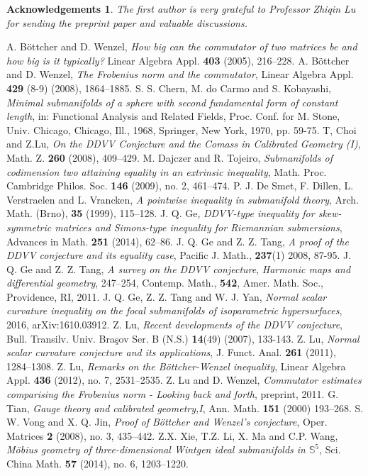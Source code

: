 \documentclass[a4paper,11pt]{amsart}
\numberwithin{equation}{section} \theoremstyle{plain}
\newtheorem{ack}{Acknowledgements}
\begin{document}
\begin{ack}
The first author is very grateful to Professor Zhiqin Lu for sending the preprint paper \cite{LW11} and valuable discussions. 
\end{ack}

\begin{thebibliography}{123}
A. B\"{o}ttcher and D. Wenzel, \emph{How big can the commutator of two matrices be and how big is it typically?} Linear Algebra Appl. \textbf{403} (2005), 216--228.
A. B\"{o}ttcher and D. Wenzel, \emph{The Frobenius norm and the commutator}, Linear Algebra Appl. \textbf{429} (8-9) (2008), 1864--1885.
S. S. Chern, M. do Carmo and S. Kobayashi, \emph{Minimal
submanifolds of a sphere with second fundamental form of constant
length}, in: Functional Analysis and Related Fields, Proc. Conf. for
M. Stone, Univ. Chicago, Chicago, Ill., 1968, Springer, New York,
1970, pp. 59-75.
T, Choi and Z.Lu, \emph{On the DDVV Conjecture and the Comass in Calibrated Geometry (I)}, Math. Z. \textbf{260} (2008), 409--429.
M. Dajczer and R. Tojeiro, \emph{Submanifolds of codimension two attaining equality in an extrinsic inequality}, Math. Proc. Cambridge Philos. Soc. \textbf{146} (2009), no. 2, 461--474.
P. J. De Smet, F. Dillen, L. Verstraelen and L. Vrancken, \emph{A pointwise inequality in submanifold
theory}, Arch. Math. (Brno), \textbf{35} (1999), 115--128.
J. Q. Ge, \emph{DDVV-type inequality for skew-symmetric matrices and Simons-type inequality for Riemannian submersions}, Advances in Math. \textbf{251} (2014), 62--86.
J. Q. Ge and Z. Z. Tang, \emph{A proof of the DDVV conjecture and its equality case}, Pacific J. Math., \textbf{237}(1)
2008, 87-95.
J. Q. Ge and Z. Z. Tang, \emph{A survey on the DDVV conjecture}, \textit{Harmonic maps and differential geometry}, 247--254, Contemp. Math., \textbf{542}, Amer. Math. Soc., Providence, RI, 2011.
J. Q. Ge, Z. Z. Tang and W. J. Yan, \emph{Normal scalar curvature inequality on the focal submanifolds of isoparametric hypersurfaces},  2016,  arXiv:1610.03912.
Z. Lu, \emph{Recent developments of the DDVV conjecture}, Bull. Transilv. Univ. Bra\c{s}ov Ser. B (N.S.) \textbf{14}(49) (2007), 133-143.
Z. Lu, \emph{Normal scalar curvature conjecture and its applications}, J. Funct. Anal. \textbf{261} (2011), 1284--1308.
Z. Lu, \emph{Remarks on the B\"{o}ttcher-Wenzel inequality}, Linear Algebra Appl. \textbf{436} (2012), no. 7, 2531--2535.
Z. Lu and D. Wenzel, \emph{Commutator estimates comparising the Frobenius norm - Looking back and forth}, preprint, 2011.
G. Tian, \emph{Gauge theory and calibrated geometry,I}, Ann. Math. \textbf{151} (2000) 193--268.
S. W. Vong and X. Q. Jin, \emph{Proof of B\"{o}ttcher and Wenzel's
conjecture}, Oper. Matrices \textbf{2} (2008), no. 3, 435--442.
Z.X. Xie, T.Z. Li, X. Ma and C.P. Wang, \emph{M\"{o}bius geometry of three-dimensional Wintgen ideal submanifolds in $\mathbb{S}^5$}, Sci. China Math. \textbf{57} (2014), no. 6, 1203--1220.
\end{thebibliography}
\end{document}

